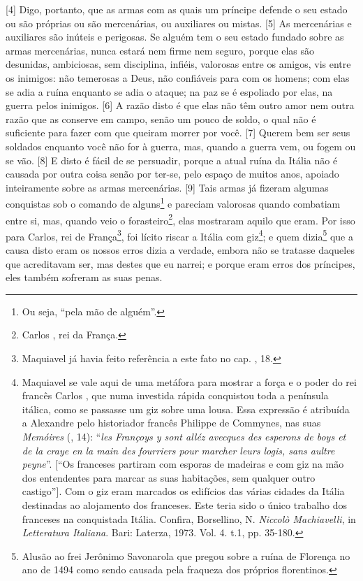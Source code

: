 {[}4{]} Digo, portanto, que as armas com as quais um príncipe defende o
seu estado ou são próprias ou são mercenárias, ou auxiliares ou mistas.
{[}5{]} As mercenárias e auxiliares são inúteis e perigosas. Se alguém
tem o seu estado fundado sobre as armas mercenárias, nunca estará nem
firme nem seguro, porque elas são desunidas, ambiciosas, sem disciplina,
infiéis, valorosas entre os amigos, vis entre os inimigos: não temerosas
a Deus, não confiáveis para com os homens; com elas se adia a ruína
enquanto se adia o ataque; na paz se é espoliado por elas, na guerra
pelos inimigos. {[}6{]} A razão disto é que elas não têm outro amor nem
outra razão que as conserve em campo, senão um pouco de soldo, o qual
não é suficiente para fazer com que queiram morrer por você. {[}7{]}
Querem bem ser seus soldados enquanto você não for à guerra, mas, quando
a guerra vem, ou fogem ou se vão. {[}8{]} E disto é fácil de se
persuadir, porque a atual ruína da Itália não é causada por outra coisa
senão por ter-se, pelo espaço de muitos anos, apoiado inteiramente sobre
as armas mercenárias. {[}9{]} Tais armas já fizeram algumas conquistas
sob o comando de alguns\footnote{Ou seja, ``pela mão de alguém''.} e
pareciam valorosas quando combatiam entre si, mas, quando veio o
forasteiro\footnote{Carlos , rei da França.}, elas mostraram aquilo que
eram. Por isso para Carlos, rei de França\footnote{Maquiavel já havia
  feito referência a este fato no cap. , 18.}, foi lícito riscar a
Itália com giz\footnote{Maquiavel se vale aqui de uma metáfora para
  mostrar a força e o poder do rei francês Carlos , que numa investida
  rápida conquistou toda a península itálica, como se passasse um giz
  sobre uma lousa. Essa expressão é atribuída a Alexandre  pelo
  historiador francês Philippe de Commynes, nas suas \emph{Memóires}
  (, 14): ``\emph{les Françoys y sont alléz avecques des esperons de
  boys et de la craye en la main des fourriers pour marcher leurs logis,
  sans aultre peyne}''. {[}``Os franceses partiram com esporas de
  madeiras e com giz na mão dos entendentes para marcar as suas
  habitações, sem qualquer outro castigo''{]}. Com o giz eram marcados
  os edifícios das várias cidades da Itália destinadas ao alojamento dos
  franceses. Este teria sido o único trabalho dos franceses na
  conquistada Itália. Confira, Borsellino, N. \emph{Niccolò
  Machiavelli}, in \emph{Letteratura Italiana}. Bari: Laterza, 1973.
  Vol. 4. t.1, pp. 35-180.}; e quem dizia\footnote{Alusão ao frei
  Jerônimo Savonarola que pregou sobre a ruína de Florença no ano de
  1494 como sendo causada pela fraqueza dos próprios florentinos.} que a
causa disto eram os nossos erros dizia a verdade, embora não se tratasse
daqueles que acreditavam ser, mas destes que eu narrei; e porque eram
erros dos príncipes, eles também sofreram as suas penas.

